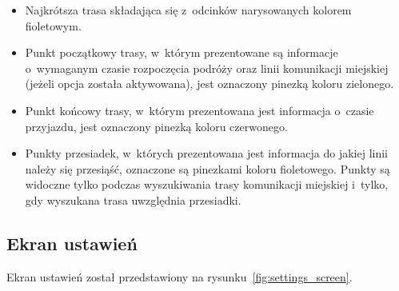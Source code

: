 \documentclass[a4paper,12pt]{article}
\begin{document}
	\begin{itemize}
		\item Najkrótsza trasa składająca się z~odcinków narysowanych kolorem fioletowym.
		\item Punkt początkowy trasy, w~którym prezentowane są informacje o~wymaganym czasie rozpoczęcia podróży oraz linii komunikacji miejskiej (jeżeli opcja została aktywowana), jest oznaczony pinezką koloru zielonego.
		\item Punkt końcowy trasy, w~którym prezentowana jest informacja o~czasie przyjazdu, jest oznaczony pinezką koloru czerwonego.
		\item Punkty przesiadek, w~których prezentowana jest informacja do jakiej linii należy się przesiąść, oznaczone są pinezkami koloru fioletowego. Punkty są widoczne tylko podczas wyszukiwania trasy komunikacji miejskiej i~tylko, gdy wyszukana trasa uwzględnia przesiadki.
	\end{itemize}

	\subsection*{Ekran ustawień}

	Ekran ustawień został przedstawiony na rysunku~\ref{fig:settings_screen}. 
\end{document}

